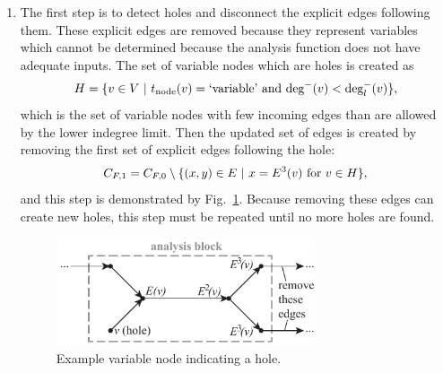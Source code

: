\begin{enumerate}
\item The first step is to detect holes and disconnect the explicit edges following them. These explicit edges are removed because they represent variables which cannot be determined because the analysis function does not have adequate inputs. The set of variable nodes which are holes is created as
\begin{equation}
H = \{v \in V \ | \  t_\textrm{node}(v) = \textrm{`variable'} \textrm{ and } \textrm{deg}^-(v) < \textrm{deg}_l^-(v) \},
\end{equation}
which is the set of variable nodes with few incoming edges than are allowed by the lower indegree limit.
Then the updated set of edges is created by removing the first set of explicit edges following the hole:
\begin{equation}
C_{F,1} = C_{F,0} \setminus \{(x,y) \in E \ | \  x=E^3(v) \textrm{ for } v \in H\},
\end{equation}
and this step is demonstrated by Fig.~\ref{f:hole}. Because removing these edges can create new holes, this step must be repeated until no more holes are found.
\begin{figure}[htb!]
	\begin{center}
	\includegraphics[width=3in]{images/analysis_block_hole}
	\end{center}
	\vspace{-20pt}
\caption{Example variable node indicating a hole.}
\label{f:hole}
\end{figure}



\end{enumerate}
